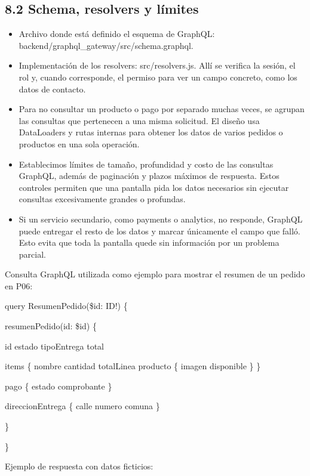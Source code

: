 \documentclass[10pt,letterpaper]{article}
\begin{document}
\subsection*{8.2 Schema, resolvers y límites}
\begin{itemize}
\item Archivo donde está definido el esquema de GraphQL: backend/\allowbreak{}graphql\_\allowbreak{}gateway/\allowbreak{}src/\allowbreak{}schema.\allowbreak{}graphql.
\item Implementación de los resolvers: src/\allowbreak{}resolvers.\allowbreak{}js. Allí se verifica la sesión, el rol y, cuando corresponde, el permiso para ver un campo concreto, como los datos de contacto.
\item Para no consultar un producto o pago por separado muchas veces, se agrupan las consultas que pertenecen a una misma solicitud. El diseño usa DataLoaders y rutas internas para obtener los datos de varios pedidos o productos en una sola operación.
\item Establecimos límites de tamaño, profundidad y costo de las consultas GraphQL, además de paginación y plazos máximos de respuesta. Estos controles permiten que una pantalla pida los datos necesarios sin ejecutar consultas excesivamente grandes o profundas.
\item Si un servicio secundario, como payments o analytics, no responde, GraphQL puede entregar el resto de los datos y marcar únicamente el campo que falló. Esto evita que toda la pantalla quede sin información por un problema parcial.
\end{itemize}
Consulta GraphQL utilizada como ejemplo para mostrar el resumen de un pedido en P06:

{\footnotesize\ttfamily\raggedright\setlength{\parskip}{0pt}
query ResumenPedido(\$id: ID!) \{\par
resumenPedido(id: \$id) \{\par
id estado tipoEntrega total\par
items \{ nombre cantidad totalLinea producto \{ imagen disponible \} \}\par
pago \{ estado comprobante \}\par
direccionEntrega \{ calle numero comuna \}\par
\}\par
\}\par}

Ejemplo de respuesta con datos ficticios:
\end{document}
